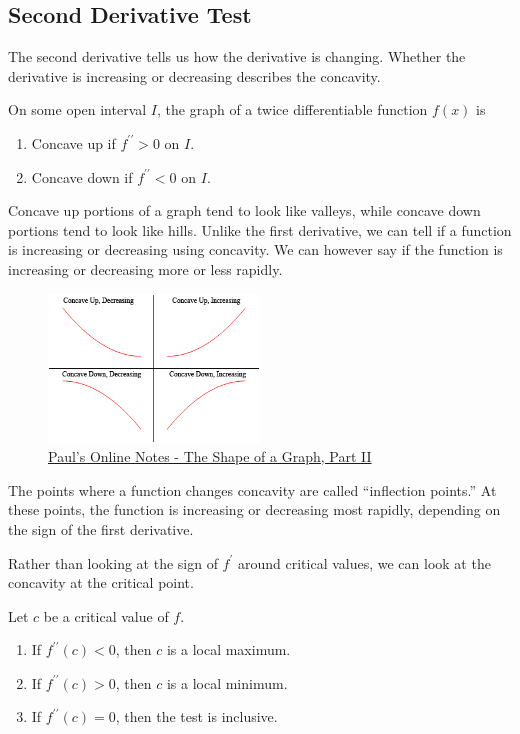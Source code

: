 \subsection{Second Derivative Test}
The second derivative tells us how the derivative is changing.
Whether the derivative is increasing or decreasing describes the concavity.
\begin{definition}
	On some open interval $I$, the graph of a twice differentiable function $f(x)$ is
	\begin{enumerate}
		\item Concave up if $f^{\prime\prime} > 0$ on $I$.
		\item Concave down if $f^{\prime\prime} < 0$ on $I$.
	\end{enumerate}
\end{definition}


Concave up portions of a graph tend to look like valleys, while concave down portions tend to look like hills.
Unlike the first derivative, we can tell if a function is increasing or decreasing using concavity.
We can however say if the function is increasing or decreasing more or less rapidly.

\begin{figure}[H]
	\label{mvt}
	\centering
	\includegraphics[width = 0.5\textwidth]{./applications_derivative/concavity.png}
	\caption{\hyperref{https://tutorial.math.lamar.edu/classes/calci/shapeofgraphptii.aspx}{}{}{Paul's Online Notes - The Shape of a Graph, Part II}}
\end{figure}


The points where a function changes concavity are called ``inflection points.''
At these points, the function is increasing or decreasing most rapidly, depending on the sign of the first derivative.


Rather than looking at the sign of $f^\prime$ around critical values, we can look at the concavity at the critical point.
\begin{theorem}
	Let $c$ be a critical value of $f$.
	\begin{enumerate}
		\item If $f^{\prime\prime}(c) < 0$, then $c$ is a local maximum.
		\item If $f^{\prime\prime}(c) > 0$, then $c$ is a local minimum.
		\item If $f^{\prime\prime}(c) = 0$, then the test is inclusive.
	\end{enumerate}
\end{theorem}

